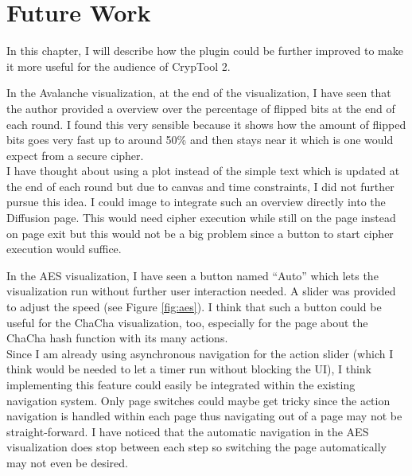 \chapter{Future Work}
\label{chap:futureWork}

In this chapter, I will describe how the plugin could be further improved to make it more useful for the audience of CrypTool 2.

\begin{description}[style=nextline]

\item[Diffusion: Better overview over flipped bits at the end of each round]

In the Avalanche visualization, at the end of the visualization, I have seen that the author provided a overview over the percentage of flipped bits at the end of each round. I found this very sensible because it shows how the amount of flipped bits goes very fast up to around 50\% and then stays near it which is one would expect from a secure cipher. \\
I have thought about using a plot instead of the simple text which is updated at the end of each round but due to canvas and time constraints, I did not further pursue this idea. I could image to integrate such an overview directly into the Diffusion page. This would need cipher execution while still on the page instead on page exit but this would not be a big problem since a button to start cipher execution would suffice.

\pagebreak

\item[Automatic navigation]

In the AES visualization, I have seen a button named ``Auto'' which lets the visualization run without further user interaction needed. A slider was provided to adjust the speed (see Figure \ref{fig:aes}). I think that such a button could be useful for the ChaCha visualization, too, especially for the page about the ChaCha hash function with its many actions. \\
Since I am already using asynchronous navigation for the action slider (which I think would be needed to let a timer run without blocking the UI), I think implementing this feature could easily be integrated within the existing navigation system. Only page switches could maybe get tricky since the action navigation is handled within each page thus navigating out of a page may not be straight-forward. I have noticed that the automatic navigation in the AES visualization does stop between each step so switching the page automatically may not even be desired.


\end{description}
